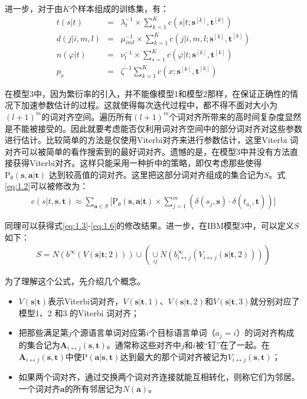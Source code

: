 \begin{appendices}
\parinterval 进一步，对于由$K$个样本组成的训练集，有：
\begin{eqnarray}
t(s|t) & = & \lambda_{t}^{-1} \times \sum_{k=1}^{K}c(s|t;\mathbf{s}^{[k]},\mathbf{t}^{[k]}) \label{eq:1.7} \\
d(j|i,m,l) & = & \mu_{iml}^{-1} \times \sum_{k=1}^{K}c(j|i,m,l;\mathbf{s}^{[k]},\mathbf{t}^{[k]}) \label{eq:1.8} \\
n(\varphi|t) & = & \nu_{t}^{-1} \times \sum_{s=1}^{K}c(\varphi |t;\mathbf{s}^{[k]},\mathbf{t}^{[k]}) \label{eq:1.9} \\
p_x & = & \zeta^{-1} \sum_{k=1}^{K}c(x;\mathbf{s}^{[k]},\mathbf{t}^{[k]}) \label{eq:1.10}
\end{eqnarray}

\parinterval 在模型3中，因为繁衍率的引入，并不能像模型1和模型2那样，在保证正确性的情况下加速参数估计的过程。这就使得每次迭代过程中，都不得不面对大小为$(l+1)^m$的词对齐空间。遍历所有$(l+1)^m$个词对齐所带来的高时间复杂度显然是不能被接受的。因此就要考虑能否仅利用词对齐空间中的部分词对齐对这些参数进行估计。比较简单的方法是仅使用Viterbi对齐来进行参数估计，这里Viterbi 词对齐可以被简单的看作搜索到的最好词对齐。遗憾的是，在模型3中并没有方法直接获得Viterbi对齐。这样只能采用一种折中的策略，即仅考虑那些使得$\textrm{P}_{\theta}(\mathbf{s},\mathbf{a}|\mathbf{t})$ 达到较高值的词对齐。这里把这部分词对齐组成的集合记为$S$。式\ref{eq:1.2}可以被修改为：
\begin{eqnarray}
c(s|t,\mathbf{s},\mathbf{t}) \approx \sum_{\mathbf{a} \in S}\big[\textrm{P}_{\theta}(\mathbf{s},\mathbf{a}|\mathbf{t}) \times \sum_{j=1}^{m}(\delta(s_j,\mathbf{s}) \cdot \delta(t_{a_{j}},\mathbf{t})) \big]
\label{eq:1.11}
\end{eqnarray}

\parinterval 同理可以获得式\ref{eq:1.3}-\ref{eq:1.6}的修改结果。进一步，在IBM模型3中，可以定义$S$如下：
\begin{eqnarray}
S = N(b^{\infty}(V(\mathbf{s}|\mathbf{t};2))) \cup (\mathop{\cup}\limits_{ij} N(b_{i \leftrightarrow j}^{\infty}(V_{i \leftrightarrow j}(\mathbf{s}|\mathbf{t},2))))
\label{eq:1.12}
\end{eqnarray}

\parinterval 为了理解这个公式，先介绍几个概念。
\begin{itemize}
\item $V(\mathbf{s}|\mathbf{t})$表示Viterbi词对齐，$V(\mathbf{s}|\mathbf{t},1)$、$V(\mathbf{s}|\mathbf{t},2)$和$V(\mathbf{s}|\mathbf{t},3)$就分别对应了模型1、2 和3 的Viterbi 词对齐；
\item 把那些满足第$j$个源语言单词对应第$i$个目标语言单词（$a_j=i$）的词对齐构成的集合记为$\mathbf{A}_{i \leftrightarrow j}(\mathbf{s},\mathbf{t})$。通常称这些对齐中$j$和$i$被``钉''在了一起。在$\mathbf{A}_{i \leftrightarrow j}(\mathbf{s},\mathbf{t})$中使$\textrm{P}(\mathbf{a}|\mathbf{s},\mathbf{t})$达到最大的那个词对齐被记为$V_{i \leftrightarrow j}(\mathbf{s},\mathbf{t})$；
\item 如果两个词对齐，通过交换两个词对齐连接就能互相转化，则称它们为邻居。一个词对齐$\mathbf{a}$的所有邻居记为$N(\mathbf{a})$。
\end{itemize}


\end{appendices}
